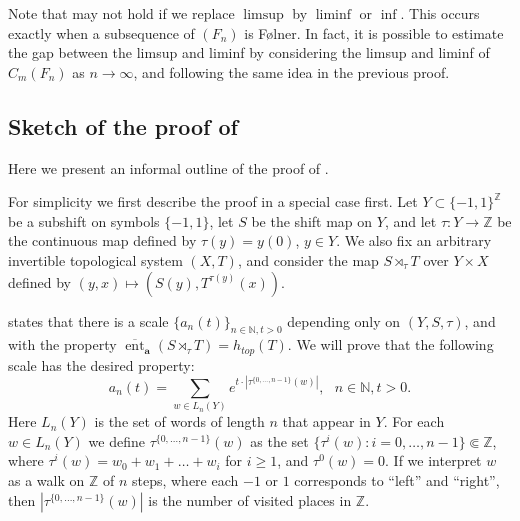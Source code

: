 \documentclass[a4paper,oneside]{amsart}
\renewcommand{\(}{\begin{dmath*}}
\renewcommand{\)}{\end{dmath*}}
\theoremstyle{definition}
\newcommand{\N}{\mathbb{N}}
\newcommand{\Z}{\mathbb{Z}}
\newcommand{\upperent}{\overline{\operatorname{ent}}}
\begin{document}
Note that  may not hold
if we replace $\limsup$ by $\liminf$ or $\inf$. This occurs exactly when a subsequence of $(F_n)$ is F\o lner. In fact, it is possible to estimate the gap between the limsup and liminf by considering  the limsup and liminf of $C_m(F_n)$ as $n\to\infty$, and following the same idea in the previous proof. 

\subsection{Sketch of the proof of }
Here we present an informal outline of the proof of . 

For simplicity we first describe the proof in a special case first.  Let $Y\subset \{-1,1\}^\Z$ be a subshift on symbols $\{-1,1\}$, let $S$ be the shift map on $Y$, and let $\tau\colon Y\to\Z$ be the continuous map defined by $\tau(y)=y(0)$, $y\in Y$. We also fix an arbitrary invertible topological system $(X,T)$, and  consider the map $S\rtimes_\tau T$ over $ Y\times X$ defined by $(y,x)\mapsto (S(y), T^{\tau(y)}(x))$. 




 states that there is a scale $\{a_n(t)\}_{n\in\N,t>0}$  depending only on $(Y,S,\tau)$, and with the property $\upperent_{\mathbf{a}}(S\rtimes_\tau T) =h_{top}(T)$. We will prove that the following scale has the desired property:
\begin{equation}\label{first-scale}a_n(t)=\sum_{w\in L_n(Y)} e^{t\cdot |\tau^{\{0,\dots,n-1\}}(w)|}, \ \ \  n\in\N, t>0.\end{equation}
Here $L_n(Y)$ is the set of words of length $n$ that appear in $Y$. For each $w\in L_n(Y)$ we define $\tau^{\{0,\dots,n-1\}}(w)$ as the set $\{\tau^i(w) : i=0,\dots,n-1\}\Subset\Z$, where $\tau^i(w)=w_0+w_1+\dots+w_i$ for $i\geq 1$, and $\tau^0(w)=0$. If we interpret $w$ as a walk on $\Z$ of $n$ steps, where each $-1$ or $1$ corresponds to ``left'' and ``right'', then $|\tau^{\{0,\dots,n-1\}}(w)|$ is the number of visited places in $\Z$. 
\end{document}
